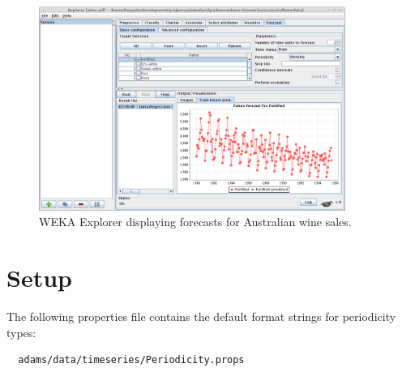 \documentclass[a4paper]{book}
\begin{document}
\begin{figure}[htb]
  \centering
  \includegraphics[width=10.0cm]{images/weka-timeseries.png}
  \caption{WEKA Explorer displaying forecasts for Australian wine sales.}
  \label{weka-timeseries}
\end{figure}

\chapter{Setup}
The following properties file contains the default format strings for
periodicity types:
\begin{verbatim}
  adams/data/timeseries/Periodicity.props
\end{verbatim}


\end{document}
